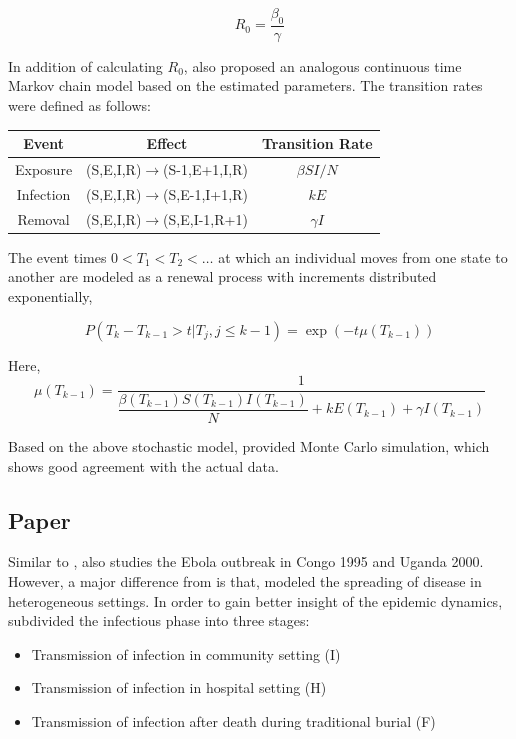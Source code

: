 \documentclass[12pt, journal,onecolumn]{IEEEtran}
\begin{document}
\begin{equation}
R_0 = \dfrac{\beta_0}{\gamma}
\end{equation}


In addition of calculating $R_0$, \citep{chowell2004basic} also proposed an analogous continuous time Markov chain model based on the estimated parameters. The transition rates were defined as follows:

\begin{center}
\begin{tabular}{|c|c|c|}
\hline 
Event & Effect & Transition Rate\tabularnewline
\hline 
\hline 
Exposure & (S,E,I,R)$\to$(S-1,E+1,I,R) & $\beta SI/N$\tabularnewline
\hline 
Infection & (S,E,I,R)$\to$(S,E-1,I+1,R) & $kE$\tabularnewline
\hline 
Removal & (S,E,I,R)$\to$(S,E,I-1,R+1) & $\gamma I$\tabularnewline
\hline 
\end{tabular}
\end{center}


The event times $0<T_1<T_2<\ldots$ at which an individual moves from one state to another are modeled as a renewal process with increments distributed exponentially,

\begin{equation}
P(T_k-T_{k-1} > t | T_j, j\leq k-1) = \exp(-t \mu (T_{k-1}) )
\end{equation}

Here, 
\[
\mu (T_{k-1}) = \frac{1}{\dfrac{\beta(T_{k-1}) S(T_{k-1}) I(T_{k-1})}{N} + k E(T_{k-1}) + \gamma I(T_{k-1})}
\]

Based on the above stochastic model, \citep{chowell2004basic} provided Monte Carlo simulation, which shows good agreement with the actual data.

\subsection{\textbf{Paper \citep{legrand2007understanding}}}
Similar to \citep{chowell2004basic}, \citep{legrand2007understanding} also studies the Ebola outbreak in Congo 1995 and Uganda 2000. However, a major difference from \citep{chowell2004basic} is that, \citep{legrand2007understanding} modeled the spreading of disease in heterogeneous settings. In order to gain better insight of the epidemic dynamics, \citep{legrand2007understanding} subdivided the infectious phase into three stages:

\begin{itemize}
\item Transmission of infection in community setting (I)
\item Transmission of infection in hospital setting (H)
\item Transmission of infection after death during traditional burial (F)
\end{itemize}
\end{document}
